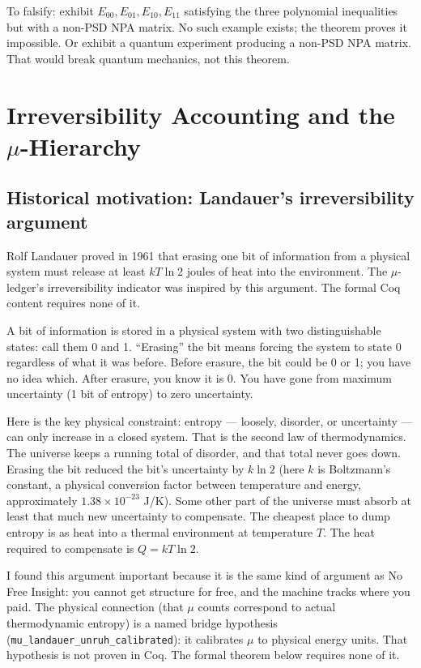 \documentclass[11pt,a4paper]{article}
\theoremstyle{plain}
\theoremstyle{definition}
\theoremstyle{remark}
\begin{document}
To falsify: exhibit $E_{00}, E_{01}, E_{10}, E_{11}$ satisfying the three polynomial inequalities but with a non-PSD NPA matrix. No such example exists; the theorem proves it impossible. Or exhibit a quantum experiment producing a non-PSD NPA matrix. That would break quantum mechanics, not this theorem.

\section{Irreversibility Accounting and the \texorpdfstring{$\mu$}{mu}-Hierarchy}
\label{sec:landauer}

\subsection{Historical motivation: Landauer's irreversibility argument}

Rolf Landauer proved in 1961 that erasing one bit of information from a physical system must release at least $kT \ln 2$ joules of heat into the environment. The $\mu$-ledger's irreversibility indicator was inspired by this argument. The formal Coq content requires none of it.

A bit of information is stored in a physical system with two distinguishable states: call them 0 and 1. ``Erasing'' the bit means forcing the system to state 0 regardless of what it was before. Before erasure, the bit could be 0 or 1; you have no idea which. After erasure, you know it is 0. You have gone from maximum uncertainty (1 bit of entropy) to zero uncertainty.

Here is the key physical constraint: entropy — loosely, disorder, or uncertainty — can only increase in a closed system. That is the second law of thermodynamics. The universe keeps a running total of disorder, and that total never goes down. Erasing the bit reduced the bit's uncertainty by $k \ln 2$ (here $k$ is Boltzmann's constant, a physical conversion factor between temperature and energy, approximately $1.38 \times 10^{-23}$ J/K). Some other part of the universe must absorb at least that much new uncertainty to compensate. The cheapest place to dump entropy is as heat into a thermal environment at temperature $T$. The heat required to compensate is $Q = kT \ln 2$.

I found this argument important because it is the same kind of argument as No Free Insight: you cannot get structure for free, and the machine tracks where you paid. The physical connection (that $\mu$ counts correspond to actual thermodynamic entropy) is a named bridge hypothesis (\texttt{mu\_landauer\_unruh\_calibrated}): it calibrates $\mu$ to physical energy units. That hypothesis is not proven in Coq. The formal theorem below requires none of it.
\end{document}
